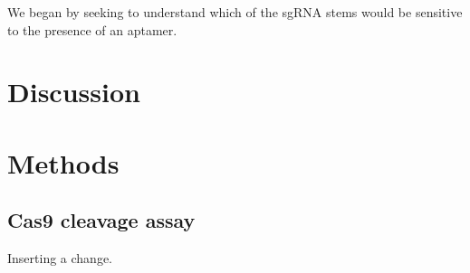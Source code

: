\documentclass[10pt,oneside]{article}
\begin{document}



We began by seeking to understand which of the sgRNA stems would be sensitive 
to the presence of an aptamer.

  






\section{Discussion}




\section{Methods}

\subsection{\Invitro{} Cas9 cleavage assay}

Inserting a change.
\end{document}
